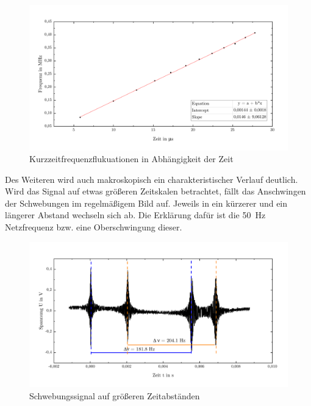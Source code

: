 \documentclass[a4paper,twoside,final]{article}
\begin{document}
\begin{figure}[htp]
    \centering
        \includegraphics[width=1\textwidth]{Bilder/Kurzzeitfluktuationen.pdf}
    \caption{Kurzzeitfrequenzflukuationen in Abhängigkeit der Zeit}
      \label{fig:Kurzzeitfluktuationen}
\end{figure}

Des Weiteren wird auch makroskopisch ein charakteristischer Verlauf deutlich. Wird das Signal auf etwas größeren Zeitskalen betrachtet, fällt das Anschwingen der Schwebungen im regelmäßigem Bild auf. Jeweils in ein kürzerer und ein längerer Abstand wechseln sich ab. Die Erklärung dafür ist die \SI{50}{\hertz} Netzfrequenz bzw. eine Oberschwingung dieser.

\begin{figure}[htp]
    \centering
        \includegraphics[width=1\textwidth]{Bilder/Fluktuationen_makroskopisch.pdf}
    \caption{Schwebungssignal auf größeren Zeitabständen}
    \label{fig:Schwebungssignal_makro}
\end{figure}

\newpage
\end{document}
